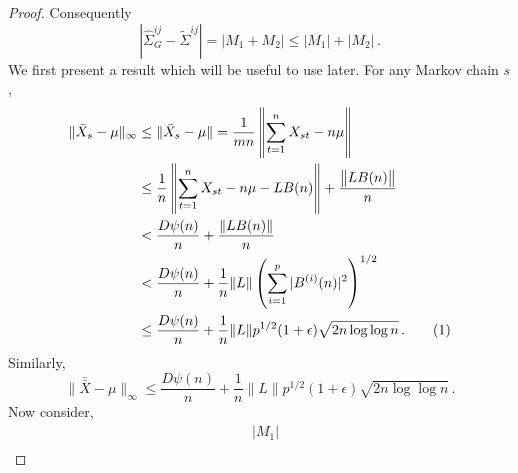 \documentclass[11pt]{article}
\newcommand\numberthis{\addtocounter{equation}{1}\tag{\theequation}}
\theoremstyle{remark}
\begin{document}
\begin{proof}
Consequently
\[
\left|\hat{\Sigma}_{G}^{ij} - \tilde{\Sigma}^{ij}  \right| = |M_1 + M_2| \leq |M_1| + |M_2|\,.
\]
%
We first present a result which will be useful to use later. For any Markov chain $s$, 
\begin{align*}
  \|\bar{X}_s - \mu\|_{\infty} & \leq \|\bar{X}_s - \mu\| = \dfrac{1}{mn}\left\|\sum_{t=1}^{n}X_{st} - n\mu\right\| \\
  & \leq \dfrac{1}{n}\left\|\sum_{t=1}^{n}X_{st} - n \mu - L B(n)\right\| + \dfrac{\left\|L B(n)\right\|}{n}\\
  &< \dfrac{D\psi(n)}{n} + \dfrac{\|L B(n)\|}{n}\\
  &< \dfrac{D\psi(n)}{n} + \dfrac{1}{n}\|L\| \left(\sum\limits_{i=1}^{p}|B^{(i)}(n)|^2\right)^{1/2}\\
  & \leq \dfrac{D\psi(n)}{n} + \dfrac{1}{n}\|L\| p^{1/2}(1+\epsilon)\sqrt{2n \log\log n}\,. \numberthis \label{eq:xbars_bound}
\end{align*}
 Similarly,
 \begin{equation}
\label{eq:xbarbar_bound}
   \| \bar{\bar{X}} - \mu\|_{\infty} \leq \dfrac{D\psi(n)}{n} + \dfrac{1}{n}\|L\| p^{1/2}(1+\epsilon)\sqrt{2n \log\log n}\,.
\end{equation}
%
Now consider,
\begin{align*}
& |M_1| \\ 

\end{align*}
\end{proof}
\end{document}
